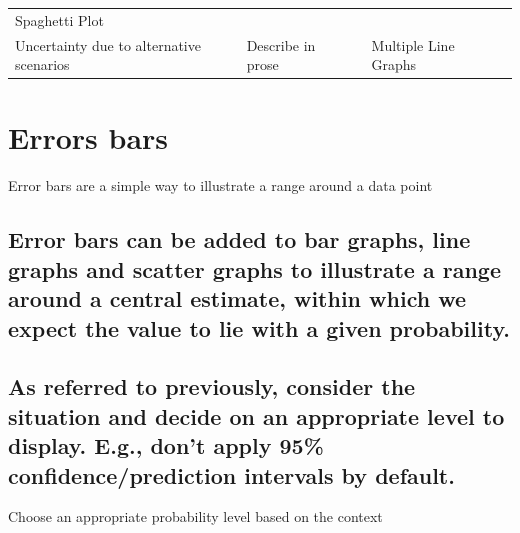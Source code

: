 \documentclass[]{book}
\begin{document}
\begin{longtable}[]{@{}lllll@{}}
\begin{minipage}[t]{0.12\columnwidth}
Spaghetti Plot\strut
\end{minipage}\tabularnewline
\begin{minipage}[t]{0.17\columnwidth}\raggedright\strut
Uncertainty due to alternative scenarios\strut
\end{minipage} & \begin{minipage}[t]{0.33\columnwidth}\raggedright\strut
Describe in prose\strut
\end{minipage} & \begin{minipage}[t]{0.14\columnwidth}\raggedright\strut
\strut
\end{minipage} & \begin{minipage}[t]{0.10\columnwidth}\raggedright\strut
Multiple Line Graphs\strut
\end{minipage} & \begin{minipage}[t]{0.12\columnwidth}\raggedright\strut
\strut
\end{minipage}\tabularnewline
\bottomrule
\end{longtable}

\section{Errors bars}\label{errors-bars}

 Error bars are a simple way to illustrate a range around a data point

\subsection{Error bars can be added to bar graphs, line graphs and
scatter graphs to illustrate a range around a central estimate, within
which we expect the value to lie with a given
probability.}\label{error-bars-can-be-added-to-bar-graphs-line-graphs-and-scatter-graphs-to-illustrate-a-range-around-a-central-estimate-within-which-we-expect-the-value-to-lie-with-a-given-probability.}

\subsection{As referred to previously, consider the situation and decide
on an appropriate level to display. E.g., don't apply 95\%
confidence/prediction intervals by
default.}\label{as-referred-to-previously-consider-the-situation-and-decide-on-an-appropriate-level-to-display.-e.g.-dont-apply-95-confidenceprediction-intervals-by-default.}

 Choose an appropriate probability level based on the context
\end{document}
